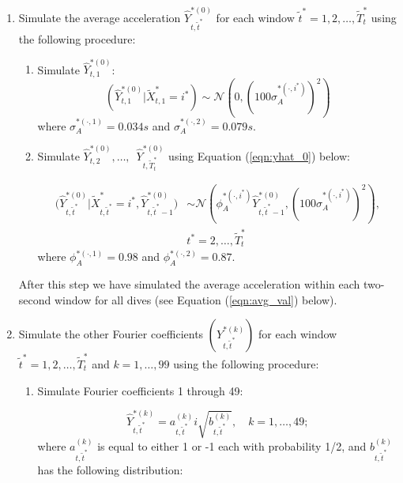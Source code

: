 \begin{enumerate}

\item Simulate the average acceleration $\hat Y^{*(0)}_{t,\tilde t^*}$ for each window $\tilde t^* = 1,2,\ldots,\tilde T^*_t$ using the following procedure:

\begin{enumerate}
    \item Simulate $\hat{Y}^{*(0)}_{t,1}$:
    \[
    	(\hat{Y}^{*(0)}_{t,1}|\tilde X^*_{t,1} = i^*) \sim \mathcal{N} \left(0, \left(100\sigma_A^{*(\cdot,i^*)}\right)^2 \right)
    \]
    where $\sigma_A^{*(\cdot,1)} = 0.034s$ and $\sigma_A^{*(\cdot,2)} = 0.079s$. 
    \item Simulate $\hat{Y}^{*(0)}_{t,2}, \ldots,\enspace \hat{Y}^{*(0)}_{t,\tilde T^*_t}$ using Equation (\ref{eqn:yhat_0}) below:
    
    \begin{align}	
        \Big(\hat{Y}^{*(0)}_{t,\tilde t^*}|\tilde X^*_{t,\tilde t^*} = i^*,\hat{Y}^{*(0)}_{t,\tilde t^*-1}\Big) &\sim \mathcal{N} \left(\phi_A^{*(\cdot,i^*)} \hat{Y}^{*(0)}_{t,\tilde t^*-1}, \left(100\sigma_A^{*(\cdot,i^*)}\right)^2 \right), \nonumber \\
        &t^* = 2,\ldots, \tilde T^*_t
    	\label{eqn:yhat_0}
    \end{align}
    where $\phi_A^{*(\cdot,1)} = 0.98$ and $\phi_A^{*(\cdot,2)} = 0.87$. 
    \end{enumerate}
    After this step we have simulated the average acceleration within each two-second window for all dives (see Equation (\ref{eqn:avg_val}) below).
    \item Simulate the other Fourier coefficients $\left(Y^{*(k)}_{t,\tilde t^*}\right)$ for each window $\tilde t^* = 1,2,\ldots,\tilde T^*_t$ and $k = 1,\ldots,99$ using the following procedure:
    \begin{enumerate}
    \item Simulate Fourier coefficients 1 through 49:
    
    \begin{equation}
        \hat{Y}^{*(k)}_{t,\tilde t^*} = a_{t,\tilde t^*}^{(k)} i\sqrt{b^{(k)}_{t,\tilde t^*}}, \quad k = 1,\ldots,49;
        \label{eqn:abYhat}
    \end{equation}
    where $a^{(k)}_{t,\tilde t^*}$ is equal to either 1 or -1 each with probability 1/2, and $b^{(k)}_{t,\tilde t^*}$ has the following distribution:
    

\end{enumerate}
\end{enumerate}
